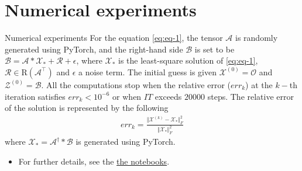 \documentclass[aspectratio=169]{beamer}
\def\fm#1{\mathcal{#1}}
\def\fm#1{\mathcal{#1}}
\def \x#1{\fm X^{(#1)}}
\begin{document}

\section{Numerical experiments}
\begin{frame}{Numerical experiments}
For the equation \eqref{eq:eq-1}, the tensor $\fm A$ is randomly generated using PyTorch, and the right-hand side $\fm B$ is set to be $\fm B= \fm A * \fm X_\ast + \fm R + \epsilon$, where $\fm X_\ast$ is the least-square solution of \eqref{eq:eq-1}, $\fm R\in \text{R}(\fm A^\top)$ and $\epsilon$ a noise term. The initial guess is given $\x{0} = \fm O$ and $\fm Z^{(0)}=\fm B$. All the  computations stop when the relative error ($err_k$) at the $k-$th iteration satisfies $err_k < 10^{-6}$ or when $IT$ exceeds $20000$ steps. The relative error of the solution is represented by the following
\begin{align*}
    err_k = \frac{\Vert \x{k}-\fm X_\ast \Vert_F^2}{\Vert \fm X_\ast \Vert_F^2}
\end{align*}
where $\fm X_\ast = \fm A^\dagger * \fm B$ is generated using PyTorch.
\end{frame}

\begin{frame}{}
\begin{itemize}
    \item  For further details, see the \href{https://drive.google.com/drive/folders/1lqGFVjWSrHsWIBxzUHLqVJsgBIZwPr2d?usp=sharing}{the notebooks}.
\end{itemize}
    
\end{frame}
\end{document}
